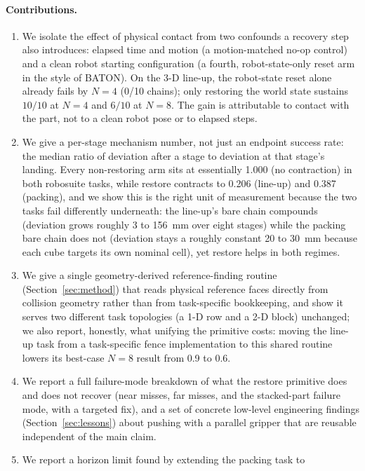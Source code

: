 \documentclass[11pt]{article}
\begin{document}
\paragraph{Contributions.}
\begin{enumerate}[leftmargin=*]
  \item We isolate the effect of physical contact from two confounds a
  recovery step also introduces: elapsed time and motion (a motion-matched
  no-op control) and a clean robot starting configuration (a fourth,
  robot-state-only reset arm in the style of BATON). On the 3-D line-up,
  the robot-state reset alone already fails by $N=4$ (0/10 chains); only
  restoring the world state sustains $10/10$ at $N=4$ and $6/10$ at $N=8$.
  The gain is attributable to contact with the part, not to a clean robot
  pose or to elapsed steps.
  \item We give a per-stage mechanism number, not just an endpoint success
  rate: the median ratio of deviation after a stage to deviation at that
  stage's landing. Every non-restoring arm sits at essentially 1.000
  (no contraction) in both robosuite tasks, while restore contracts to
  0.206 (line-up) and 0.387 (packing), and we show this is the right unit
  of measurement because the two tasks fail differently underneath: the
  line-up's bare chain compounds (deviation grows roughly 3 to 156~mm over
  eight stages) while the packing bare chain does not (deviation stays a
  roughly constant 20 to 30~mm because each cube targets its own nominal
  cell), yet restore helps in both regimes.
  \item We give a single geometry-derived reference-finding routine
  (Section~\ref{sec:method}) that reads physical reference faces directly
  from collision geometry rather than from task-specific bookkeeping, and
  show it serves two different task topologies (a 1-D row and a 2-D block)
  unchanged; we also report, honestly, what unifying the primitive costs:
  moving the line-up task from a task-specific fence implementation to this
  shared routine lowers its best-case $N=8$ result from 0.9 to 0.6.
  \item We report a full failure-mode breakdown of what the restore
  primitive does and does not recover (near misses, far misses, and the
  stacked-part failure mode, with a targeted fix), and a set of concrete
  low-level engineering findings (Section~\ref{sec:lessons}) about pushing
  with a parallel gripper that are reusable independent of the main claim.
  \item We report a horizon limit found by extending the packing task to

\end{enumerate}
\end{document}
